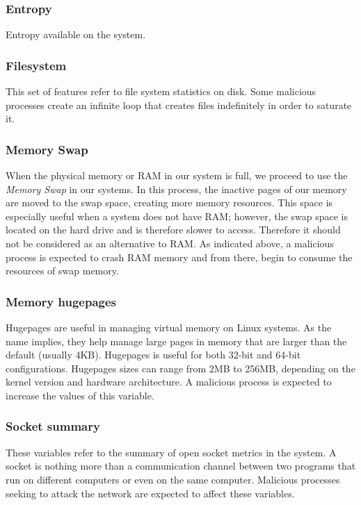 \documentclass{iosart2c}
\begin{document}
\subsubsection{Entropy}
Entropy available on the system.

\subsubsection{Filesystem}

This set of features refer to file system statistics on disk. Some malicious processes create an infinite loop that creates files indefinitely in order to saturate it. \\

\subsubsection{Memory Swap}

When the physical memory or RAM in our system is full, we proceed to use the \textit{Memory Swap} in our systems. In this process, the inactive pages of our memory are moved to the swap space, creating more memory resources. This space is especially useful when a system does not have RAM; however, the swap space is located on the hard drive and is therefore slower to access. Therefore it should not be considered as an alternative to RAM. As indicated above, a malicious process is expected to crash RAM memory and from there, begin to consume the resources of swap memory.


\subsubsection{Memory hugepages}

Hugepages are useful in managing virtual memory on Linux systems. As the name implies, they help manage large pages in memory that are larger than the default (usually 4KB). Hugepages is useful for both 32-bit and 64-bit configurations. Hugepages sizes can range from 2MB to 256MB, depending on the kernel version and hardware architecture. A malicious process is expected to increase the values of this variable. \\



\subsubsection{Socket summary}
These variables refer to the summary of open socket metrics in the system. A socket is nothing more than a communication channel between two programs that run on different computers or even on the same computer. Malicious processes seeking to attack the network are expected to affect these variables.  \\
\end{document}
